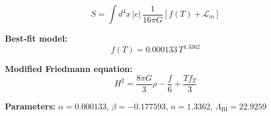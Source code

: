 
\begin{equation}
  S = \int d^4x \, |e| \, \frac{1}{16\pi G} \left[ f(T) + \mathcal{L}_m \right]
\end{equation}

\textbf{Best-fit model:}
\begin{equation}
  f(T) = 0.000133 \, T^{1.3362}
\end{equation}

\textbf{Modified Friedmann equation:}
\begin{equation}
  H^2 = \frac{8\pi G}{3} \rho - \frac{f}{6} + \frac{T f_T}{3}
\end{equation}

\textbf{Parameters:}
$\alpha = 0.000133$, \quad
$\beta = -0.177593$, \quad
$n = 1.3362$, \quad
$\Lambda_{\text{BI}} = 22.9259$